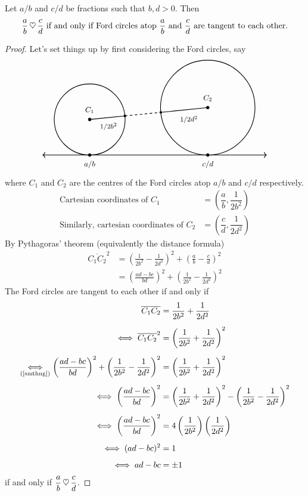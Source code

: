 \begin{theorem}
Let $a/b$ and $c/d$ be fractions such that $b,d>0$. Then
\[\frac{a}{b}\,\heartsuit\, \frac{c}{d}\ \text{if and only if Ford circles atop $\dfrac{a}{b}$ and $\dfrac{c}{d}$ are tangent to each other.}\]
\end{theorem}
\begin{proof}
Let's set things up by first considering the Ford circles, say
\[\begin{tikzpicture}[scale=2]
    \draw[thick](1,1) circle (1);
    \fill (1,1) circle (1pt);
    \fill (0.005,0.9) circle (0.75pt);
    \draw[thick](-1.5,0.75) circle (0.75);
    \fill (-1.5,0.75) circle (1pt);
    \fill (-0.7537,0.825) circle (0.75pt);
    \draw[<->,thick] (-2.5,0)--(2.25,0);
    \draw[dashed,thick] (-0.7537,0.825)--(0.005,0.9);
    \draw[thick] (0.005,0.9)--(1,1);
    \draw[thick] (-1.5,0.75)--(-0.7537,0.825);
    \foreach \x in {1,-1.5}
    {
    \fill (\x,0) circle (1pt);
    }
    \node[] at (1,-0.2) {\small $c/d$};
    \node[] at (-1.5,-0.2) {\small $a/b$};
    \node[] at (1,1.2) {\small $C_2$};
    \node[] at (-1.5,0.95) {\small $C_1$};
    \node[] at (-1.1,0.6) {\footnotesize $1/2b^2$};
    \node[] at (0.6,0.75) {\footnotesize $1/2d^2$};
\end{tikzpicture}\]
where $C_1$ and $C_2$ are the centres of the Ford circles atop $a/b$ and $c/d$ respectively.
\begin{align*}
\text{Cartesian coordinates of } C_1 &= \left(\dfrac{a}{b},\dfrac{1}{2b^2}\right)\\[0.5em]
\text{Similarly, cartesian coordinates of } C_2 &= \left(\dfrac{c}{d},\dfrac{1}{2d^2}\right)
\end{align*}
By Pythagoras' theorem (equivalently the distance formula)
\begin{align*}\label{smthng}
\overline{C_1C_2}^2 &= \left(\frac{1}{2b^2} - \frac{1}{2d^2}\right)^2 + \left(\frac{a}{b} - \frac{c}{d}\right)^2\\[0.5em]
&= \left(\frac{ad-bc}{bd}\right)^2 + \left(\frac{1}{2b^2} - \frac{1}{2d^2}\right)^2\tag{1}
\end{align*}
The Ford circles are tangent to each other if and only if
\begin{align*}
\overline{C_1C_2} &= \frac{1}{2b^2} + \frac{1}{2d^2}\\[0.5em]
\iff\overline{C_1C_2}^2 &= \left(\frac{1}{2b^2} + \frac{1}{2d^2}\right)^2\\[0.5em]
\underset{\refp{smthng}}{\iff}\left(\frac{ad-bc}{bd}\right)^2 + \left(\frac{1}{2b^2} - \frac{1}{2d^2}\right)^2 &= \left(\frac{1}{2b^2} + \frac{1}{2d^2}\right)^2\\[0.5em]
\iff\left(\frac{ad-bc}{bd}\right)^2 &= \left(\frac{1}{2b^2} + \frac{1}{2d^2}\right)^2 - \left(\frac{1}{2b^2} - \frac{1}{2d^2}\right)^2\\[0.5em]
\iff\left(\frac{ad-bc}{bd}\right)^2 &= 4\left(\frac{1}{2b^2}\right)\left(\frac{1}{2d^2}\right)\\[0.5em]
\iff(ad-bc)^2&= 1\\[0.5em]
\iff ad-bc&= \pm 1
\end{align*}
if and only if $\dfrac{a}{b}\,\heartsuit\, \dfrac{c}{d}$.
\end{proof}

